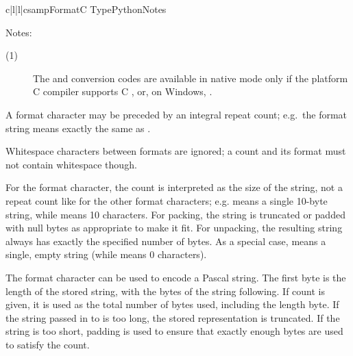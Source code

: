 \begin{tableiv}{c|l|l|c}{samp}{Format}{C Type}{Python}{Notes}
\end{tableiv}

\noindent
Notes:

\begin{description}
\item[(1)]
  The  and  conversion codes are available in
  native mode only if the platform C compiler supports C ,
  or, on Windows, .
\end{description}


A format character may be preceded by an integral repeat count;
e.g.\ the format string  means exactly the same as
.

Whitespace characters between formats are ignored; a count and its
format must not contain whitespace though.

For the  format character, the count is interpreted as the
size of the string, not a repeat count like for the other format
characters; e.g.  means a single 10-byte string, while
 means 10 characters.  For packing, the string is
truncated or padded with null bytes as appropriate to make it fit.
For unpacking, the resulting string always has exactly the specified
number of bytes.  As a special case,  means a single, empty
string (while  means 0 characters).

The  format character can be used to encode a Pascal
string.  The first byte is the length of the stored string, with the
bytes of the string following.  If count is given, it is used as the
total number of bytes used, including the length byte.  If the string
passed in to  is too long, the stored representation
is truncated.  If the string is too short, padding is used to ensure
that exactly enough bytes are used to satisfy the count.

